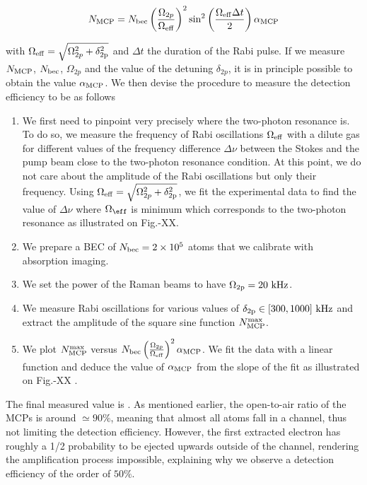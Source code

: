 \begin{equation}
    N_{\rm{MCP}}=N_{\rm{bec}} \left(\frac{\Omega_{2 p}}{\Omega_{\rm{eff}}}\right)^{2} \sin ^{2}\left(\frac{\Omega_{\rm{eff}}  \Delta t}{2}\right) \alpha_{\rm{MCP}}
\end{equation}

\noindent with  $\Omega_{\rm{eff}}= \sqrt{\Omega_{2p}^2 + \delta_{\rm{2p}}^2}$ and $\Delta t$ the duration of the Rabi pulse. If we measure $N_{\rm{MCP}}$, $N_{\rm{bec}}$, $\Omega_{2p}$ and the value of the detuning  $\delta_{2p}$, it is in principle possible to obtain the value $\alpha_{\rm{MCP}}$. We then devise the procedure to measure the detection efficiency to be as follows

\begin{enumerate}
    \item We first need to pinpoint very precisely where the two-photon resonance is. To do so, we measure the frequency of Rabi oscillations $\Omega_{\rm{eff}}$ with a dilute gas for different values of the frequency difference $\Delta \nu$ between the Stokes and the pump beam close to the two-photon resonance condition. At this point, we do not care about the amplitude of the Rabi oscillations but only their frequency. Using $\Omega_{\rm{eff}}= \sqrt{\Omega_{2p}^2 + \delta_{\rm{2p}}^2}$, we fit the experimental data to find the value of $\Delta \nu$ where $\Omega_{\eff}$ is minimum which corresponds to the two-photon resonance as illustrated on Fig.-XX.
    \item We prepare a BEC of $N_{\rm{bec}} = 2 \times 10^5$ atoms that we calibrate with absorption imaging.
    \item We set the power of the Raman beams to have $\Omega_{\rm{2p}}=20 \ \rm{kHz}$.
    \item We measure Rabi oscillations for various values of $\delta_{\rm{2p}} \in [300,1000] \ \rm{kHz}$ and extract the amplitude of the square sine function $N^{\rm{max}}_{\rm{MCP}}$.
    \item We plot $N^{\rm{max}}_{\rm{MCP}}$ versus $N_{\rm{bec}} \left(\frac{\Omega_{2 p}}{\Omega_{\rm{eff}}}\right)^{2} \alpha_{\rm{MCP}}$. We fit the data with a linear function and deduce the value of $\alpha_{\rm{MCP}}$ from the slope of the fit as illustrated on Fig.-XX .
\end{enumerate}

\noindent The final measured value is . As mentioned earlier, the open-to-air ratio of the MCPs is around $\simeq 90 \%$, meaning that almost all atoms fall in a channel, thus not limiting the detection efficiency. However, the first extracted electron has roughly a 1/2 probability to be ejected upwards outside of the channel, rendering the amplification process impossible, explaining why we observe a detection efficiency of the order of $50 \%$.



